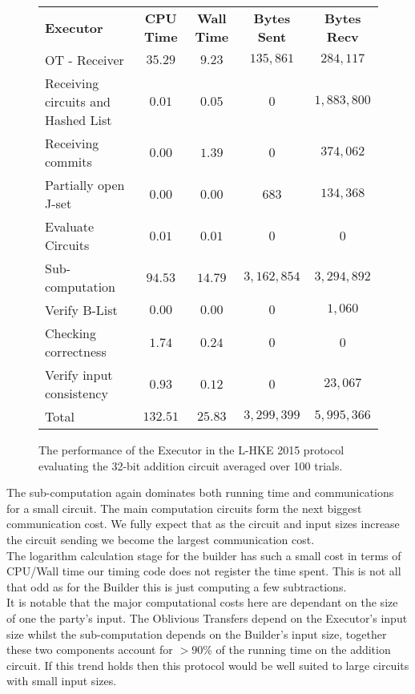 \documentclass[ %
                    author={Nicholas Tutte},
                supervisor={Prof. Nigel Smart},
                    degree={MEng},
                     title={Secure Two Party Computation},
                  subtitle={A practical comparison of recent protocols},
                      type={Research - GG1K},
                      year={2015} ]{dissertation}
\begin{document}
				\begin{figure}[!ht]
					\begin{tabular}{| p{4.3cm} | c c c c |}
						\hline
						\textbf{Executor} & \textbf{CPU Time} & \textbf{Wall Time} & \textbf{Bytes Sent} & \textbf{Bytes Recv} \\
						\thickhline
						OT - Receiver & $35.29$ & $9.23$ & $135,861$ & $284,117$ \\
						\hline
						Receiving circuits and Hashed List & $0.01$ & $0.05$ & $0$ & $1,883,800$ \\
						\hline
						Receiving commits & $0.00$ & $1.39$ & $0$ & $374,062$ \\
						\hline
						Partially open J-set & $0.00$ & $0.00$ & $683$ & $134,368$ \\
						\hline
						Evaluate Circuits & $0.01$ & $0.01$ & $0$ & $0$ \\
						\hline
						Sub-computation & $94.53$ & $14.79$ & $3,162,854$ & $3,294,892$ \\
						\hline
						Verify B-List & $0.00$ & $0.00$ & $0$ & $1,060$ \\
						\hline
						Checking correctness & $1.74$ & $0.24$ & $0$ & $0$ \\
						\hline
						Verify input consistency & $0.93$ & $0.12$ & $0$ & $23,067$ \\
						\thickhline
						Total & $132.51$ & $25.83$ & $3,299,399$ & $5,995,366$ \\
						\hline
					\end{tabular}
					\caption{The performance of the Executor in the L-HKE 2015 protocol evaluating the 32-bit addition circuit averaged over 100 trials. \label{table:L-HKE_2015_Add_Executor}}
				\end{figure}
				\FloatBarrier

				The sub-computation again dominates both running time and communications for a small circuit. The main computation circuits form the next biggest communication cost. We fully expect that as the circuit and input sizes increase the circuit sending we become the largest communication cost.\\

				The logarithm calculation stage for the builder has such a small cost in terms of CPU/Wall time our timing code does not register the time spent. This is not all that odd as for the Builder this is just computing a few subtractions.\\

				It is notable that the major computational costs here are dependant on the size of one the party's input. The Oblivious Transfers depend on the Executor's input size whilst the sub-computation depends on the Builder's input size, together these two components account for $>90\%$ of the running time on the addition circuit. If this trend holds then this protocol would be well suited to large circuits with small input sizes.\\
\end{document}
